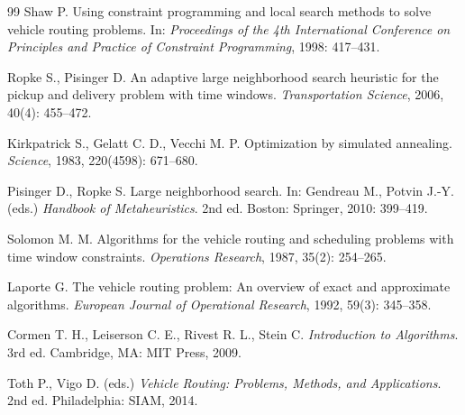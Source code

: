 \documentclass[11pt,a4paper]{ctexart}
\begin{document}
\begin{thebibliography}{99}
Shaw P. Using constraint programming and local search methods to solve vehicle routing problems. In: \emph{Proceedings of the 4th International Conference on Principles and Practice of Constraint Programming}, 1998: 417--431.

Ropke S., Pisinger D. An adaptive large neighborhood search heuristic for the pickup and delivery problem with time windows. \emph{Transportation Science}, 2006, 40(4): 455--472.

Kirkpatrick S., Gelatt C. D., Vecchi M. P. Optimization by simulated annealing. \emph{Science}, 1983, 220(4598): 671--680.

Pisinger D., Ropke S. Large neighborhood search. In: Gendreau M., Potvin J.-Y. (eds.) \emph{Handbook of Metaheuristics}. 2nd ed. Boston: Springer, 2010: 399--419.

Solomon M. M. Algorithms for the vehicle routing and scheduling problems with time window constraints. \emph{Operations Research}, 1987, 35(2): 254--265.

Laporte G. The vehicle routing problem: An overview of exact and approximate algorithms. \emph{European Journal of Operational Research}, 1992, 59(3): 345--358.

Cormen T. H., Leiserson C. E., Rivest R. L., Stein C. \emph{Introduction to Algorithms}. 3rd ed. Cambridge, MA: MIT Press, 2009.

Toth P., Vigo D. (eds.) \emph{Vehicle Routing: Problems, Methods, and Applications}. 2nd ed. Philadelphia: SIAM, 2014.
\end{thebibliography}
\end{document}
